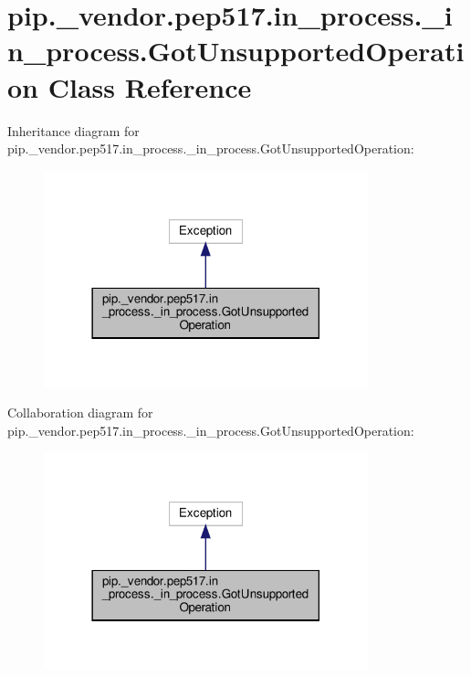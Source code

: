 \hypertarget{classpip_1_1__vendor_1_1pep517_1_1in__process_1_1__in__process_1_1GotUnsupportedOperation}{}\section{pip.\+\_\+vendor.\+pep517.\+in\+\_\+process.\+\_\+in\+\_\+process.\+Got\+Unsupported\+Operation Class Reference}
\label{classpip_1_1__vendor_1_1pep517_1_1in__process_1_1__in__process_1_1GotUnsupportedOperation}


Inheritance diagram for pip.\+\_\+vendor.\+pep517.\+in\+\_\+process.\+\_\+in\+\_\+process.\+Got\+Unsupported\+Operation\+:
\nopagebreak
\begin{figure}[H]
\begin{center}
\leavevmode
\includegraphics[width=266pt]{classpip_1_1__vendor_1_1pep517_1_1in__process_1_1__in__process_1_1GotUnsupportedOperation__inherit__graph}
\end{center}
\end{figure}


Collaboration diagram for pip.\+\_\+vendor.\+pep517.\+in\+\_\+process.\+\_\+in\+\_\+process.\+Got\+Unsupported\+Operation\+:
\nopagebreak
\begin{figure}[H]
\begin{center}
\leavevmode
\includegraphics[width=266pt]{classpip_1_1__vendor_1_1pep517_1_1in__process_1_1__in__process_1_1GotUnsupportedOperation__coll__graph}
\end{center}
\end{figure}
